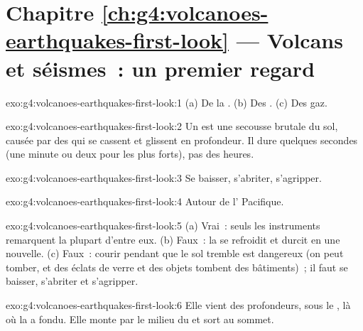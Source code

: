 \section*{Chapitre \ref{ch:g4:volcanoes-earthquakes-first-look} --- Volcans et séismes~: un premier regard}

\begin{solution}{exo:g4:volcanoes-earthquakes-first-look:1}
(a) De la . (b) Des . (c) Des gaz.
\end{solution}

\begin{solution}{exo:g4:volcanoes-earthquakes-first-look:2}
Un  est une secousse brutale du sol, causée par des  qui se
cassent et glissent en profondeur. Il dure quelques secondes (une minute ou
deux pour les plus forts), pas des heures.
\end{solution}

\begin{solution}{exo:g4:volcanoes-earthquakes-first-look:3}
Se baisser, s'abriter, s'agripper.
\end{solution}

\begin{solution}{exo:g4:volcanoes-earthquakes-first-look:4}
Autour de l' Pacifique.
\end{solution}

\begin{solution}{exo:g4:volcanoes-earthquakes-first-look:5}
(a) Vrai~: seuls les instruments remarquent la plupart d'entre eux.
(b) Faux~: la  se refroidit et durcit en une  nouvelle. (c) Faux~:
courir pendant que le sol tremble est dangereux (on peut tomber, et des
éclats de verre et des objets tombent des bâtiments)~; il faut se baisser,
s'abriter et s'agripper.
\end{solution}

\begin{solution}{exo:g4:volcanoes-earthquakes-first-look:6}
Elle vient des profondeurs, sous le , là où la  a fondu. Elle
monte par le milieu du  et sort au sommet.
\end{solution}

